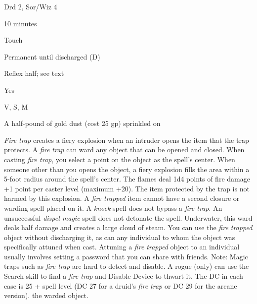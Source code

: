 
\begin{description*}
\item[Level:] Drd 2, Sor/Wiz 4
\item[Casting Time:] 10 minutes
\item[Range:] Touch
\item[Duration:] Permanent until discharged (D)
\item[Saving Throw:] Reflex half; see text
\item[Spell Resistance:] Yes
\item[Components:] V, S, M
\item[Arcane Material Component:] A half-pound of gold dust (cost 25 gp) sprinkled on
\end{description*}

\textit{Fire trap} creates a fiery explosion when an intruder opens the item that
the trap protects. A \textit{fire trap} can ward any object that can be opened
and closed.
When casting \textit{fire trap}, you select a point on the object as the spell's
center. When someone other than you opens the object, a fiery explosion fills the
area within a 5-foot radius around the spell's center. The flames deal 1d4 points
of fire damage +1 point per caster level (maximum +20). The item protected by the
trap is not harmed by this explosion.
A \textit{fire trapped} item cannot have a second closure or warding spell placed
on it.
A \textit{knock} spell does not bypass a \textit{fire trap}.  An unsuccessful \textit{dispel
magic} spell does not detonate the spell.
Underwater, this ward deals half damage and creates a large cloud of steam.
You can use the \textit{fire trapped} object without discharging it, as can any
individual to whom the object was specifically attuned when cast. Attuning a \textit{fire
trapped} object to an individual usually involves setting a password that you can
share with friends.
Note: Magic traps such as \textit{fire trap} are hard to detect and disable.
A rogue (only) can use the Search skill to find a \textit{fire trap} and Disable
Device to thwart it. The DC in each case is 25 + spell level (DC 27 for a druid's
\textit{fire trap} or DC 29 for the arcane version).
the warded object.